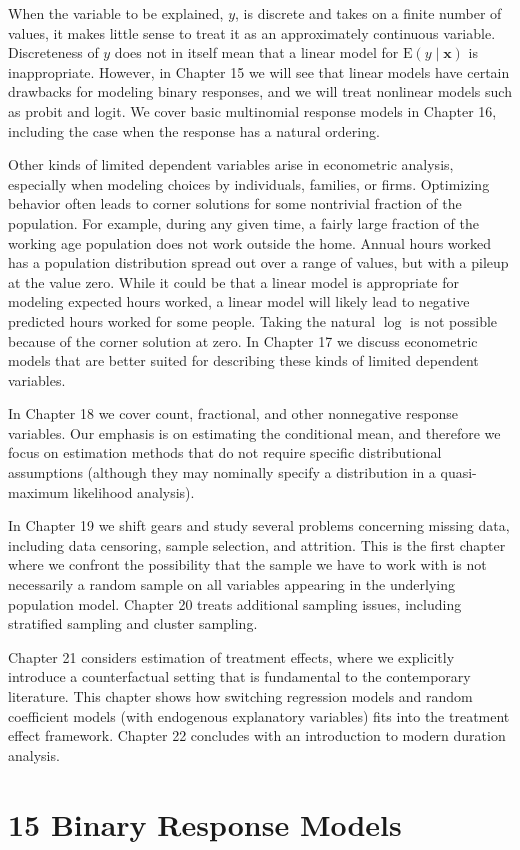 \documentclass[10pt]{article}
\begin{document}
When the variable to be explained, $y$, is discrete and takes on a finite number of values, it makes little sense to treat it as an approximately continuous variable. Discreteness of $y$ does not in itself mean that a linear model for $\mathrm{E}(y \mid \mathbf{x})$ is inappropriate. However, in Chapter 15 we will see that linear models have certain drawbacks for modeling binary responses, and we will treat nonlinear models such as probit and logit. We cover basic multinomial response models in Chapter 16, including the case when the response has a natural ordering.

Other kinds of limited dependent variables arise in econometric analysis, especially when modeling choices by individuals, families, or firms. Optimizing behavior often leads to corner solutions for some nontrivial fraction of the population. For example, during any given time, a fairly large fraction of the working age population does not work outside the home. Annual hours worked has a population distribution spread out over a range of values, but with a pileup at the value zero. While it could be that a linear model is appropriate for modeling expected hours worked, a linear model will likely lead to negative predicted hours worked for some people. Taking the natural $\log$ is not possible because of the corner solution at zero. In Chapter 17 we discuss econometric models that are better suited for describing these kinds of limited dependent variables.

In Chapter 18 we cover count, fractional, and other nonnegative response variables. Our emphasis is on estimating the conditional mean, and therefore we focus on estimation methods that do not require specific distributional assumptions (although they may nominally specify a distribution in a quasi-maximum likelihood analysis).

In Chapter 19 we shift gears and study several problems concerning missing data, including data censoring, sample selection, and attrition. This is the first chapter where we confront the possibility that the sample we have to work with is not necessarily a random sample on all variables appearing in the underlying population model. Chapter 20 treats additional sampling issues, including stratified sampling and cluster sampling.

Chapter 21 considers estimation of treatment effects, where we explicitly introduce a counterfactual setting that is fundamental to the contemporary literature. This chapter shows how switching regression models and random coefficient models (with endogenous explanatory variables) fits into the treatment effect framework. Chapter 22 concludes with an introduction to modern duration analysis.

\section*{15 Binary Response Models}
\end{document}
